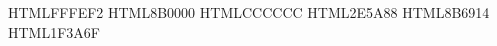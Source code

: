 \usepackage{tabularx}
\usepackage{booktabs}
\usepackage{array}      %
\usepackage{caption}

\renewcommand{\theequation}{\Roman{chapter}.\arabic{equation}}
\renewcommand{\thetable}{\Roman{chapter}.\arabic{table}}

%
\usepackage{xcolor}
\definecolor{paper-cream}    {HTML}{FFFEF2}  %
\definecolor{accent-deep}    {HTML}{8B0000}  %
\definecolor{rule-gray}      {HTML}{CCCCCC}
\definecolor{status-exact}   {HTML}{2E5A88}  %
\definecolor{status-soft}    {HTML}{8B6914}  %
\definecolor{link-navy}      {HTML}{1F3A6F}  %

